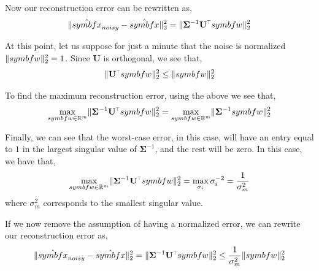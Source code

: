 \documentclass[SE,authoryear,toc]{lsstdoc}
\renewcommand{\v}[1]{\mathbf{#1}}
\newcommand{\tr}{\scalebox{0.6}{$\top$}}
\DeclarePairedDelimiter{\norm}{\lVert}{\rVert}
\begin{document}
Now our reconstruction error can be rewritten as, 
\begin{equation}
    \norm{\hat{\\symbf{x}}_{noisy} - \hat{\\symbf{x}}}_2^2 = \norm{\v{\Sigma}^{-1}\v{U}^{\tr}\\symbf{w} }_2^2
\end{equation}

At this point, let us suppose for just a minute that the noise is normalized $\norm{\\symbf{w}}_2^2 = 1$. Since $\v{U}$ is orthogonal, we see that, 
\begin{equation}
    \norm{\v{U}^{\tr}\\symbf{w}}_2^2 \leq \norm{\\symbf{w}}^2_2
\end{equation}

To find the maximum reconstruction error, using the above we see that, 
\begin{equation}
    \max_{\\symbf{w} \in \mathbb{R}^m} \norm{\v{\Sigma}^{-1}\v{U}^{\tr}\\symbf{w} }_2^2 = \max_{\\symbf{w} \in \mathbb{R}^m} \norm{\v{\Sigma}^{-1}\\symbf{w} }_2^2
\end{equation}

Finally, we can see that the worst-case error, in this case, will have an entry equal to $1$ in the largest singular value of $\v{\Sigma}^{-1}$, and the rest will be zero. In this case, we have that,
\begin{equation}
    \max_{\\symbf{w} \in \mathbb{R}^m} \norm{\v{\Sigma}^{-1}\v{U}^{\tr}\\symbf{w} }_2^2 = \max_{\sigma_i} \sigma_i^{-2} = \frac{1}{\sigma_m^2}
\end{equation}
where $\sigma_m^2$ corresponds to the smallest singular value. 

If we now remove the assumption of having a normalized error, we can rewrite our reconstruction error as, 
\begin{equation}
    \norm{\hat{\\symbf{x}}_{noisy} - \hat{\\symbf{x}}}_2^2 = \norm{\v{\Sigma}^{-1}\v{U}^{\tr}\\symbf{w} }_2^2 \leq  \frac{1}{\sigma_m^2} \norm{\\symbf{w}}^2_2
\end{equation}
\end{document}
